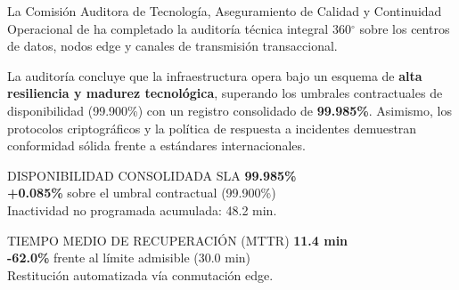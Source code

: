 \documentclass[11pt,letterpaper]{article}
\begin{document}
La Comisi\'on Auditora de Tecnolog\'ia, Aseguramiento de Calidad y Continuidad Operacional de \textbf{\corporatebrandlegal} ha completado la auditor\'ia t\'ecnica integral 360$^\circ$ sobre los centros de datos, nodos edge y canales de transmisi\'on transaccional.

La auditor\'ia concluye que la infraestructura opera bajo un esquema de \textbf{alta resiliencia y madurez tecnol\'ogica}, superando los umbrales contractuales de disponibilidad (99.900\%) con un registro consolidado de \textbf{99.985\%}. Asimismo, los protocolos criptogr\'aficos y la pol\'itica de respuesta a incidentes demuestran conformidad s\'olida frente a est\'andares internacionales.

\vspace{0.4em}

\noindent
\begin{minipage}[t]{0.485\textwidth}
  \begin{corpmetric}{DISPONIBILIDAD CONSOLIDADA SLA}
    {\fontsize{18}{20}\selectfont\bfseries\color{corpPrimary} 99.985\%}\\[2pt]
    {\footnotesize\color{corpSuccess}\textbf{+0.085\%} sobre el umbral contractual (99.900\%)}\\[1pt]
    {\scriptsize\color{corpTextMuted}Inactividad no programada acumulada: 48.2 min.}
  \end{corpmetric}
\end{minipage}\hfill
\begin{minipage}[t]{0.485\textwidth}
  \begin{corpmetric}{TIEMPO MEDIO DE RECUPERACI\'ON (MTTR)}
    {\fontsize{18}{20}\selectfont\bfseries\color{corpPrimary} 11.4 min}\\[2pt]
    {\footnotesize\color{corpSuccess}\textbf{-62.0\%} frente al l\'imite admisible (30.0 min)}\\[1pt]
    {\scriptsize\color{corpTextMuted}Restituci\'on automatizada v\'ia conmutaci\'on edge.}
  \end{corpmetric}
\end{minipage}

\vspace{0.3em}
\end{document}
